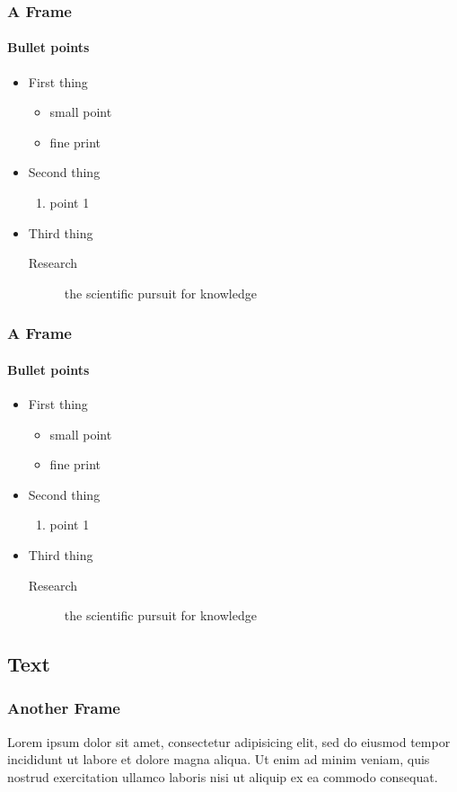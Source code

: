 \begin{frame}
\frametitle{A Frame}
\framesubtitle{Bullet points}
\begin{itemize}
\item First thing
	\begin{itemize}
	\item small point
	\item fine print
	\end{itemize}
\item Second thing
	\begin{enumerate}
	\item point 1
	\end{enumerate}
\item Third thing
	\begin{description}
	\item[Research] the scientific pursuit for knowledge
	\end{description}
\end{itemize}
\end{frame}

\begin{frame}
\frametitle{A Frame}
\framesubtitle{Bullet points}
\begin{itemize}
\item First thing
	\begin{itemize}
	\item small point
	\item fine print
	\end{itemize}
\item Second thing
	\begin{enumerate}
	\item point 1
	\end{enumerate}
\item Third thing
	\begin{description}
	\item[Research] the scientific pursuit for knowledge
	\end{description}
\end{itemize}
\end{frame}

\subsection{Text}
\begin{frame}
\frametitle{Another Frame}
Lorem ipsum dolor sit amet, consectetur adipisicing elit, sed do eiusmod tempor incididunt ut labore et dolore magna aliqua. Ut enim ad minim veniam, quis nostrud exercitation ullamco laboris nisi ut aliquip ex ea commodo consequat.
\end{frame}


